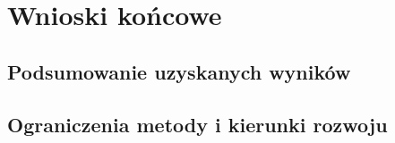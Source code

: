 \section*{Wnioski końcowe}
\label{sec:conclusion}


\subsection*{Podsumowanie uzyskanych wyników}

\subsection*{Ograniczenia metody i kierunki rozwoju}
